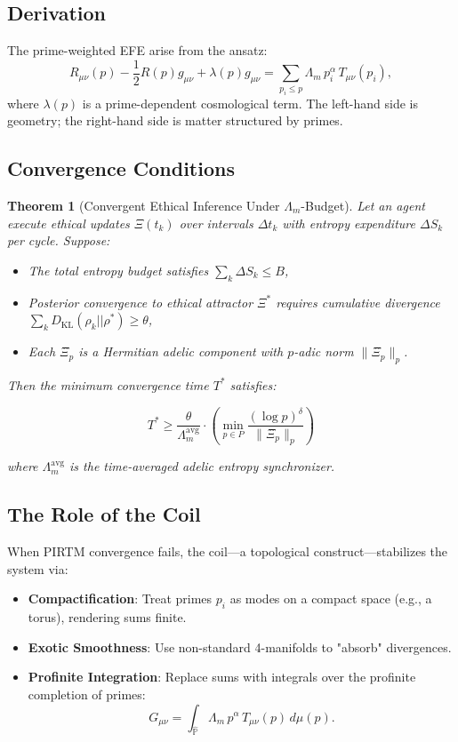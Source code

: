 \documentclass{article}
\theoremstyle{plain}
\newtheorem{theorem}{Theorem}
\theoremstyle{claimstyle}
\begin{document}
\subsection{Derivation}
The prime-weighted EFE arise from the ansatz:
\[
R_{\mu\nu}(p) - \frac{1}{2} R(p) g_{\mu\nu} + \lambda(p) g_{\mu\nu} = \sum_{p_i \leq p} \Lambda_m \, p_i^\alpha \, T_{\mu\nu}(p_i),
\]
where \( \lambda(p) \) is a prime-dependent cosmological term. The left-hand side is geometry; the right-hand side is matter structured by primes.

\subsection{Convergence Conditions}
\begin{theorem}[Convergent Ethical Inference Under $\Lambda_m$-Budget]
Let an agent execute ethical updates $\Xi(t_k)$ over intervals $\Delta t_k$ with entropy expenditure $\Delta S_k$ per cycle. Suppose:

\begin{itemize}
  \item The total entropy budget satisfies $\sum_k \Delta S_k \leq B$,
  \item Posterior convergence to ethical attractor $\Xi^*$ requires cumulative divergence $\sum_k D_{\mathrm{KL}}(\rho_k || \rho^*) \geq \theta$,
  \item Each $\Xî_p$ is a Hermitian adelic component with $p$-adic norm $\| \Xî_p \|_p$.
\end{itemize}

Then the minimum convergence time $T^*$ satisfies:

\[
T^* \geq \frac{\theta}{\Lambda_m^{\mathrm{avg}}} \cdot \left( \min_{p \in P} \frac{(\log p)^\delta}{\| \Xî_p \|_p} \right)
\]

where $\Lambda_m^{\mathrm{avg}}$ is the time-averaged adelic entropy synchronizer.
\end{theorem}


\subsection{The Role of the Coil}
When PIRTM convergence fails, the coil—a topological construct—stabilizes the system via:
\begin{itemize}
    \item \textbf{Compactification}: Treat primes \( p_i \) as modes on a compact space (e.g., a torus), rendering sums finite.
    \item \textbf{Exotic Smoothness}: Use non-standard 4-manifolds to "absorb" divergences.
    \item \textbf{Profinite Integration}: Replace sums with integrals over the profinite completion of primes:
    \[
    G_{\mu\nu} = \int_{\hat{\mathbb{P}}} \Lambda_m \, p^\alpha \, T_{\mu\nu}(p) \, d\mu(p).
    \]
\end{itemize}
\end{document}
